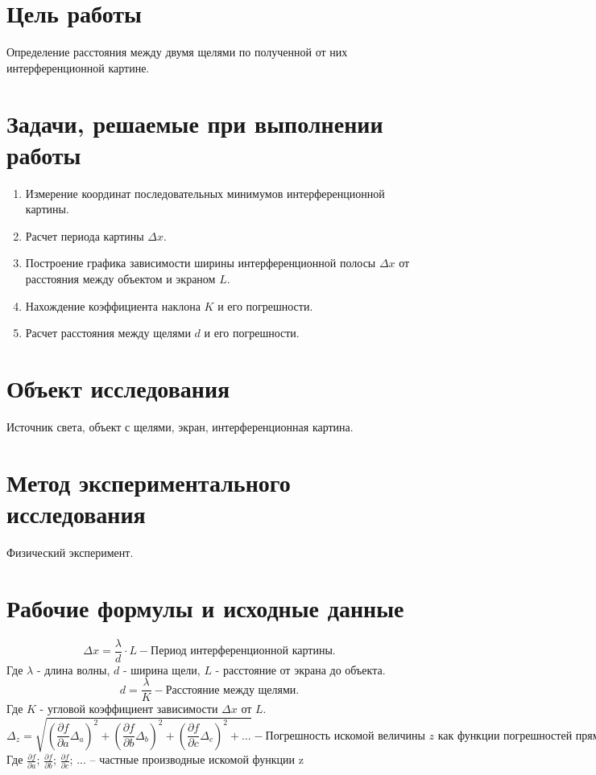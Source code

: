 \documentclass{article}
\begin{document}
\section{Цель работы}
\begin{enumerate}
     Определение расстояния между двумя щелями по полученной от них интерференционной картине.
\end{enumerate}

\section{Задачи, решаемые при выполнении работы}
\begin{enumerate}
    \item Измерение координат последовательных минимумов интерференционной картины.
    \item Расчет периода картины $\Delta x$.
    \item Построение графика зависимости ширины интерференционной полосы $\Delta x$ от расстояния между объектом и экраном $L$.
    \item Нахождение коэффициента наклона $K$ и его погрешности.
    \item Расчет расстояния между щелями $d$ и его погрешности.
\end{enumerate}

\section{Объект исследования}
Источник света, объект с щелями, экран, интерференционная картина.
\section{Метод экспериментального исследования}
Физический эксперимент.
\section{Рабочие формулы и исходные данные}
\begin{equation}
 \Delta x=\frac{\lambda}{d}\cdot L - \textit{Период интерференционной картины.}
 \label{eq:ref1}
\end{equation}
Где $\lambda$ - длина волны, $d$ - ширина щели, $L$ - расстояние от экрана
до объекта.
\begin{equation}
 d=\frac{\lambda}{K} - \textit{Расстояние между щелями.}
 \label{eq:ref2}
\end{equation}
Где $K$ - угловой коэффициент зависимости $\Delta x$ от $L$.
\begin{equation}
 \Delta_{z}=\sqrt{(\frac{\partial f}{\partial a}\Delta_{a})^2 + (\frac{\partial f}{\partial b}\Delta_{b})^2 + (\frac{\partial f}{\partial c}\Delta_{c})^2 + ...} - \textit{Погрешность искомой величины z как функции погрешностей прямо измеренных величин.}
 \label{eq:ref3}
\end{equation}
Где $\frac{\partial f}{\partial a}$; $\frac{\partial f}{\partial b}$; $\frac{\partial f}{\partial c}$; ... – частные производные искомой функции z
\newpage
\end{document}

